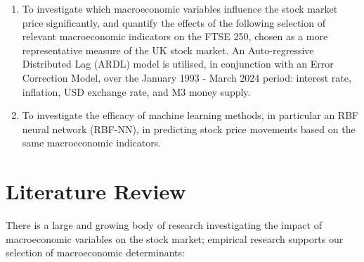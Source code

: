 \documentclass[12pt,a4paper]{article}
\begin{document}
\begin{enumerate}
    \item To investigate which macroeconomic variables influence the stock market price significantly, and quantify the effects of the following selection of relevant macroeconomic indicators on the FTSE 250, chosen as a more representative measure of the UK stock market. An Auto-regressive Distributed Lag (ARDL) model is utilised, in conjunction with an Error Correction Model, over the January 1993 - March 2024 period: interest rate, inflation, USD exchange rate, and M3 money supply. 
    \item To investigate the efficacy of machine learning methods, in particular an RBF neural network (RBF-NN), in predicting stock price movements based on the same macroeconomic indicators. 
\end{enumerate}

\section{Literature Review}

There is a large and growing body of research investigating the impact of macroeconomic variables on the stock market; empirical research supports our selection of macroeconomic determinants:
\end{document}
